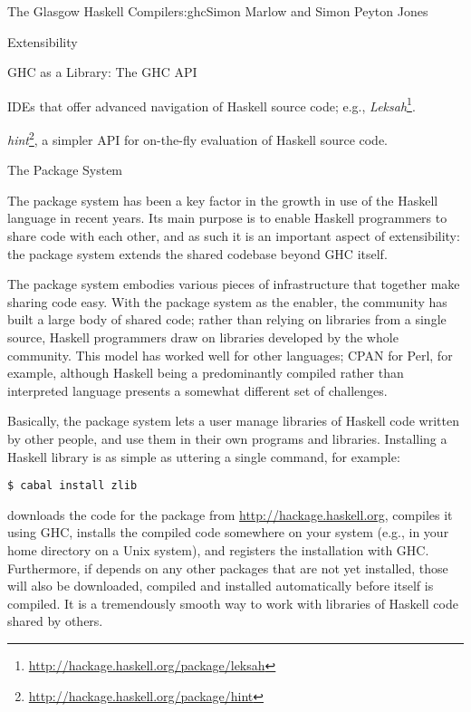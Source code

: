 \begin{aosachapter}{The Glasgow Haskell Compiler}{s:ghc}{Simon Marlow and Simon Peyton Jones}
\begin{aosasect1}{Extensibility}
\begin{aosasect2}{GHC as a Library: The GHC API}
\begin{aosaitemize}
\item IDEs that offer advanced navigation of Haskell source code;
  e.g., \emph{Leksah}\footnote{\url{http://hackage.haskell.org/package/leksah}}.

\item
  \emph{hint}\footnote{\url{http://hackage.haskell.org/package/hint}},
  a simpler API for on-the-fly evaluation of Haskell source code.

\end{aosaitemize}

\end{aosasect2}

\begin{aosasect2}{The Package System}

The package system has been a key factor in the growth in use of the
Haskell language in recent years.  Its main purpose is to enable
Haskell programmers to share code with each other, and as such it is an
important aspect of extensibility: the package system extends the
shared codebase beyond GHC itself.

The package system embodies various pieces of infrastructure that
together make sharing code easy.  With the package system as the
enabler, the community has built a large body of shared code; rather
than relying on libraries from a single source, Haskell programmers
draw on libraries developed by the whole community.  This model has
worked well for other languages; CPAN for Perl, for example, although
Haskell being a predominantly compiled rather than interpreted
language presents a somewhat different set of challenges.

Basically, the package system lets a user manage libraries of Haskell
code written by other people, and use them in their own programs and
libraries.  Installing a Haskell library is as simple as uttering a
single command, for example:

\begin{verbatim}
$ cabal install zlib
\end{verbatim}

\noindent
downloads the code for the  package from
\url{http://hackage.haskell.org}, compiles it using GHC, installs the
compiled code somewhere on your system (e.g., in your home directory
on a Unix system), and registers the installation with GHC.
Furthermore, if  depends on any other packages that are not
yet installed, those will also be downloaded, compiled and installed
automatically before  itself is compiled.  It is a
tremendously smooth way to work with libraries of Haskell code shared
by others.


\end{aosasect2}
\end{aosasect1}
\end{aosachapter}
